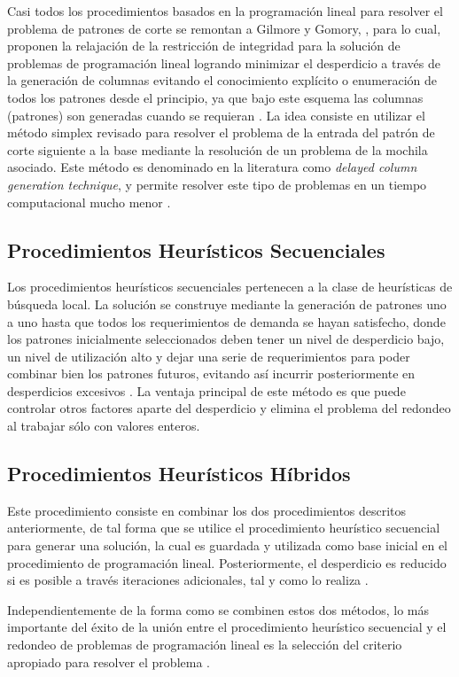 \documentclass[a4paper,10pt,twocolumn]{article}
\begin{document}
Casi todos los procedimientos basados en la
programación lineal para resolver el problema de
patrones de corte se remontan a Gilmore y Gomory,
\cite{1}, para lo cual, proponen la relajación de la restricción
de integridad para la solución de problemas de
programación lineal logrando minimizar el desperdicio
a través de la generación de columnas evitando el
conocimiento explícito o enumeración de todos los
patrones desde el principio, ya que bajo este esquema
las columnas (patrones) son generadas cuando se
requieran \cite{2}. La idea consiste en utilizar el método
simplex revisado para resolver el problema de la entrada
del patrón de corte siguiente a la base mediante la
resolución de un problema de la mochila asociado. Este
método es denominado en la literatura como \textit{delayed
column generation technique}, y permite resolver este
tipo de problemas en un tiempo computacional mucho
menor \cite{3}.


\subsection{Procedimientos Heurísticos Secuenciales}
Los procedimientos heurísticos secuenciales pertenecen
a la clase de heurísticas de búsqueda local. La solución
se construye mediante la generación de patrones uno
a uno hasta que todos los requerimientos de demanda
se hayan satisfecho, donde los patrones inicialmente
seleccionados deben tener un nivel de desperdicio
bajo, un nivel de utilización alto y dejar una serie de requerimientos para poder combinar bien los patrones
futuros, evitando así incurrir posteriormente en
desperdicios excesivos \cite{3}. La ventaja principal de este método es que puede controlar otros factores aparte del desperdicio y elimina
el problema del redondeo al trabajar sólo con valores
enteros.

\subsection{Procedimientos Heurísticos Híbridos }
Este procedimiento consiste en combinar los dos
procedimientos descritos anteriormente, de tal forma
que se utilice el procedimiento heurístico secuencial
para generar una solución, la cual es guardada y
utilizada como base inicial en el procedimiento de
programación lineal. Posteriormente, el desperdicio es
reducido si es posible a través iteraciones adicionales,
tal y como lo realiza \cite{41}. 

Independientemente de la forma como
se combinen estos dos métodos, lo más importante
del éxito de la unión entre el procedimiento heurístico
secuencial y el redondeo de problemas de programación
lineal es la selección del criterio apropiado para resolver
el problema \cite{29}.
\end{document}
